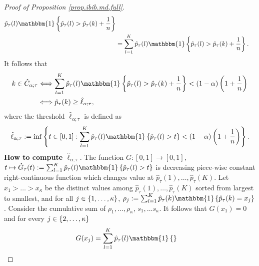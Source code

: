 \documentclass[11pt]{article}
\begin{document}
\begin{proof}[Proof of Proposition \ref{prop.ibib.md.full}]
\begin{align*}
        \hat{p}_{\tau}(l)
        \mathbbm{1} \brac{
            \hat{p}_{\tau}(l)
            >
            \hat{p}_{\tau}(k)
            + \frac{1}{n}
        }
        \\
        &
        =
        \sum_{l = 1}^{K}
        \hat{p}_{\tau}(l)
        \mathbbm{1} \brac{
            \hat{p}_{\tau}(l)
            >
            \hat{p}_{\tau}(k)
            + \frac{1}{n}
        }.
    \end{align*}
    It follows that
    \begin{align*}
        k \in \hat{C}_{\alpha; \tau}
        &
        \Longleftrightarrow
        \sum_{l = 1}^{K}
        \hat{p}_{\tau}(l)
        \mathbbm{1} \brac{
            \hat{p}_{\tau}(l)
            >
            \hat{p}_{\tau}(k)
            + \frac{1}{n}
        } < \paren{1 - \alpha} \paren{1 + \frac{1}{n}}
        \\
        &
        \Longleftrightarrow
        \hat{p}_{\tau}(k) \geq \hat{\ell}_{\alpha; \tau},
    \end{align*}
    where the threshold $\hat{\ell}_{\alpha; \tau}$ is defined as
    \begin{align}
        \label{eq.threshold.md.full}
        \hat{\ell}_{\alpha; \tau}
        := \inf
        \brac{t \in [0, 1]: 
        \sum_{l = 1}^{K}
        \hat{p}_{\tau}(l)
        \mathbbm{1} \brac{
            \hat{p}_{\tau}(l)
            >
            t
        } < \paren{1 - \alpha} \paren{1 + \frac{1}{n}}}.
    \end{align}
    \textbf{How to compute $\hat{\ell}_{\alpha; \tau}$}.
    The function $G : [0, 1] \to [0, 1]$, $t \mapsto \hat{G}_{\tau}(t) := \sum_{l = 1}^{K}
        \hat{p}_{\tau}(l)
        \mathbbm{1} \brac{
            \hat{p}_{\tau}(l)
            >
            t
    }$
    is decreasing piece-wise constant right-continuous function
    which changes value at $\hat{p}_{\tau}(1), \ldots, \hat{p}_{\tau}(K)$.
    Let $x_1 > \ldots > x_{\kappa}$
    be the distinct values among $\hat{p}_{\tau}(1), \ldots, \hat{p}_{\tau}(K)$
    sorted from largest to smallest,
    and for all $j \in \left\{ 1, \ldots, \kappa \right\}$,
    $\rho_j := \sum_{l = 1}^{K} \hat{p}_{\tau}(k) \mathbbm{1} \brac{\hat{p}_{\tau}(k) = x_j}$.
    Consider the cumulative sum of $\rho_1, \ldots, \rho_{\kappa}$, $s_{1}, \ldots s_{\kappa}$.
    It follows that $G(x_1) = 0$ and for every $j \in \left\{ 2, \ldots, \kappa \right\}$
    \begin{align*}
        G(x_j)
        &
        = \sum_{l = 1}^{K}
            \hat{p}_{\tau}(l)
            \mathbbm{1} \brac{
}
\end{align*}
\end{proof}
\end{document}
